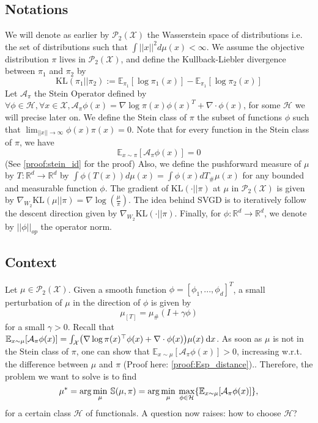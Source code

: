 \documentclass[runningheads,a4paper]{llncs}
\newcommand{\R}{\mathbb{R}}
\newcommand{\E}{\mathbb{E}}
\renewcommand{\S}{\mathbb{S}}
\newcommand{\X}{\mathcal{X}}
\newcommand{\A}{\mathcal{A}}
\renewcommand{\P}{\mathcal{P}}
\newcommand{\KL}{\mathrm{KL}}
\renewcommand{\H}{\mathcal{H}}
\renewcommand{\S}{\mathbb{S}}
\renewcommand{\d}{\: \mathrm{d}}
\DeclarePairedDelimiter{\pare}{(}{)}
\DeclarePairedDelimiter{\bra}{\{}{\}}
\begin{document}
\subsection{Notations}
We will denote as earlier by $\P_2(\X)$ the Wasserstein space of distributions i.e. the set of distributions such that $\int ||x||^2 d\mu(x) < \infty$. We assume the objective distribution $\pi$ lives in $\P_2(\X)$, and define the Kullback-Liebler divergence between $\pi_1$ and $\pi_2$ by
$$\KL(\pi_1||\pi_2) := \E_{\pi_1} [\log \pi_1(x)] - \E_{\pi_1}[\log \pi_2(x)]$$ \newline
Let $\A_\pi$ the Stein Operator defined by $\forall \phi \in \H, \forall x \in \X, \A_\pi \phi(x) = \nabla \log \pi(x) \phi(x)^T + \nabla\cdot \phi(x)$, for some $\H$ we will precise later on. \newline
We define the Stein class of $\pi$ the subset of functions $\phi$ such that $\lim_{||x||\longrightarrow \infty} \phi(x)\pi(x) = 0$. Note that for every function in the Stein class of $\pi$, we have \begin{equation}
  \E_{x \sim \pi}[\A_\pi \phi (x)] = 0
  \label{eq:stein_id}
\end{equation}
(See \ref{proof:stein_id} for the proof)\newline
Also, we define the pushforward measure of $\mu$ by $T:\R^d \longrightarrow \R^d$ by $\int \phi(T(x)) d\mu(x) = \int \phi(x) dT_\#\mu(x)$ for any bounded and measurable function $\phi$. \newline
The gradient of $\KL(\cdot||\pi)$ at $\mu$ in $\P_2(\X)$ is given by $\nabla_{W_2}\KL(\mu||\pi) = \nabla \log(\frac{\mu}{\pi})$. The idea behind SVGD is to iteratively follow the descent direction given by $\nabla_{W_2} \KL (\cdot||\pi)$. \newline
Finally, for $\phi : \R^d \longrightarrow \R^d$, we denote by $||\phi||_{op}$ the operator norm. \newline

\subsection{Context}
Let $\mu \in \P_2(\X)$. Given a smooth function $\phi = [\phi_1,...,\phi_d]^T$, a small perturbation of $\mu$ in the direction of $\phi$ is given by 
\begin{equation}
    \mu_{[T]} = \mu_\#(I+\gamma \phi)
\end{equation}
for a small $\gamma > 0$. \newline
Recall that $\E_{x \sim \mu}[\A_\pi \phi (x)] = \int_\X \pare*{ \nabla \log \pi(x)^\top \phi(x) + \nabla \cdot \phi(x) } \mu(x) \d x$. As soon as $\mu$ is not in the Stein class of $\pi$, one can show that $\E_{x \sim \mu}[\A_\pi \phi (x)] > 0$, increasing w.r.t. the difference between $\mu$ and $\pi$ (Proof here: \ref{proof:Esp_distance}).. \newline
Therefore, the problem we want to solve is to find
\begin{equation}
  \mu^* = \arg\min_{\mu} \: \S(\mu, \pi) =
    \arg\min_{\mu} \: \max_{\phi \in \H} \bra*{ \E_{x \sim \mu}[\A_\pi \phi (x)] },
  \label{eq:stein_obj}
\end{equation}
for a certain class $\H$ of functionals. A question now raises: how to choose $\H$?
\end{document}
